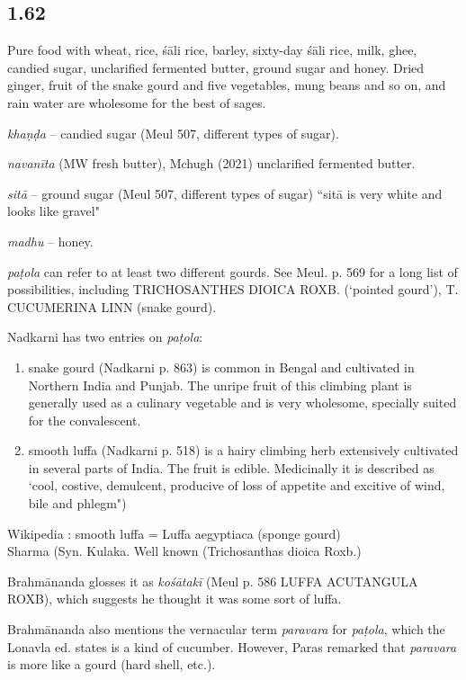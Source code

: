 \begin{ekdosis}
\subsection*{1.62}
\begin{translation}[hp01_062]
Pure food with wheat, rice, śāli rice, barley, sixty-day śāli rice, milk, ghee, candied sugar, unclarified fermented butter, ground sugar and honey. Dried ginger, fruit of the snake gourd and five vegetables, mung beans and so on, and rain water are wholesome for the best of sages.
\end{translation}

\begin{philcomm}[hp01_062]
\emph{khaṇḍa} -- candied sugar (Meul 507, different types of sugar).

\emph{navanīta} (MW fresh butter), Mchugh (2021) unclarified fermented butter.

\emph{sitā} -- ground sugar (Meul 507, different types of sugar) ``sitā is very white and looks like gravel"

\emph{madhu} -- honey.

\emph{paṭola} can refer to at least two different gourds. See Meul. p. 569 for a long list of possibilities, including TRICHOSANTHES DIOICA ROXB. (`pointed gourd'), T. CUCUMERINA LINN (snake gourd).

Nadkarni has two entries on \emph{paṭola}:
\begin{enumerate}
\item snake gourd (Nadkarni p. 863) is common in Bengal and cultivated in Northern India and Punjab. The unripe fruit of this climbing plant is generally used as a culinary vegetable and is very wholesome, specially suited for the convalescent. 

\item smooth luffa (Nadkarni p. 518) is a hairy climbing herb extensively cultivated in several parts of India. The fruit is edible. Medicinally it is described as `cool, costive, demulcent, producive of loss of appetite and excitive of wind, bile and phlegm")
\end{enumerate}

Wikipedia : smooth luffa = Luffa aegyptiaca (sponge gourd)\\
Sharma (Syn. Kulaka. Well known (Trichosanthas dioica Roxb.)

Brahmānanda glosses it as \emph{kośātakī} (Meul p. 586 LUFFA ACUTANGULA ROXB), which suggests he thought it was some sort of luffa.

Brahmānanda also mentions the vernacular term \emph{paravara} for \emph{paṭola}, which the Lonavla ed. states is a kind of cucumber. However, Paras remarked that \emph{paravara} is more like a gourd (hard shell, etc.).


\end{philcomm}
\end{ekdosis}
